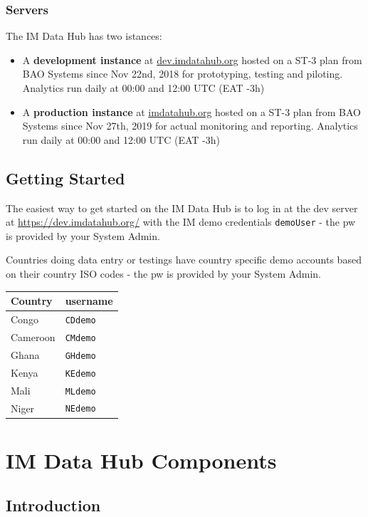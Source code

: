 \documentclass[]{book}
\providecommand{\tightlist}{%
  \setlength{\itemsep}{0pt}\setlength{\parskip}{0pt}}
\begin{document}
\hypertarget{servers}{%
\subsection{Servers}\label{servers}}

The IM Data Hub has two istances:

\begin{itemize}
\tightlist
\item
  A \textbf{development instance} at \href{https://dev.imdatahub.org}{dev.imdatahub.org} hosted on a ST-3 plan from BAO Systems since Nov 22nd, 2018 for prototyping, testing and piloting. Analytics run daily at 00:00 and 12:00 UTC (EAT -3h)
\item
  A \textbf{production instance} at \href{https://imdatahub.org}{imdatahub.org} hosted on a ST-3 plan from BAO Systems since Nov 27th, 2019 for actual monitoring and reporting. Analytics run daily at 00:00 and 12:00 UTC (EAT -3h)
\end{itemize}

\hypertarget{getting-started}{%
\section{Getting Started}\label{getting-started}}

The easiest way to get started on the IM Data Hub is to log in at the dev server at \url{https://dev.imdatahub.org/} with the IM demo credentials \texttt{demoUser} - the pw is provided by your System Admin.

Countries doing data entry or testings have country specific demo accounts based on their country ISO codes - the pw is provided by your System Admin.

\begin{longtable}[]{@{}ll@{}}
\toprule
Country & username\tabularnewline
\midrule
\endhead
Congo & \texttt{CDdemo}\tabularnewline
Cameroon & \texttt{CMdemo}\tabularnewline
Ghana & \texttt{GHdemo}\tabularnewline
Kenya & \texttt{KEdemo}\tabularnewline
Mali & \texttt{MLdemo}\tabularnewline
Niger & \texttt{NEdemo}\tabularnewline
\bottomrule
\end{longtable}

\hypertarget{comp}{%
\chapter{IM Data Hub Components}\label{comp}}

\hypertarget{introduction}{%
\section{Introduction}\label{introduction}}
\end{document}
